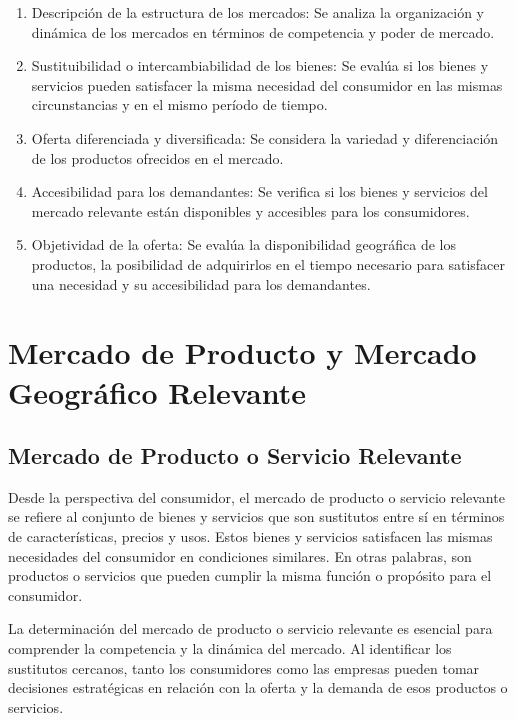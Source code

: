 \documentclass[
  a4paper,
]{article}
\begin{document}
\begin{enumerate}
\def\labelenumi{\arabic{enumi}.}
\item
  Descripción de la estructura de los mercados: Se analiza la
  organización y dinámica de los mercados en términos de competencia y
  poder de mercado.
\item
  Sustituibilidad o intercambiabilidad de los bienes: Se evalúa si los
  bienes y servicios pueden satisfacer la misma necesidad del consumidor
  en las mismas circunstancias y en el mismo período de tiempo.
\item
  Oferta diferenciada y diversificada: Se considera la variedad y
  diferenciación de los productos ofrecidos en el mercado.
\item
  Accesibilidad para los demandantes: Se verifica si los bienes y
  servicios del mercado relevante están disponibles y accesibles para
  los consumidores.
\item
  Objetividad de la oferta: Se evalúa la disponibilidad geográfica de
  los productos, la posibilidad de adquirirlos en el tiempo necesario
  para satisfacer una necesidad y su accesibilidad para los demandantes.
\end{enumerate}

\hypertarget{mercado-de-producto-y-mercado-geogruxe1fico-relevante}{%
\section{Mercado de Producto y Mercado Geográfico
Relevante}\label{mercado-de-producto-y-mercado-geogruxe1fico-relevante}}

\hypertarget{mercado-de-producto-o-servicio-relevante}{%
\subsection{Mercado de Producto o Servicio
Relevante}\label{mercado-de-producto-o-servicio-relevante}}

Desde la perspectiva del consumidor, el mercado de producto o servicio
relevante se refiere al conjunto de bienes y servicios que son
sustitutos entre sí en términos de características, precios y usos.
Estos bienes y servicios satisfacen las mismas necesidades del
consumidor en condiciones similares. En otras palabras, son productos o
servicios que pueden cumplir la misma función o propósito para el
consumidor.

La determinación del mercado de producto o servicio relevante es
esencial para comprender la competencia y la dinámica del mercado. Al
identificar los sustitutos cercanos, tanto los consumidores como las
empresas pueden tomar decisiones estratégicas en relación con la oferta
y la demanda de esos productos o servicios.
\end{document}
